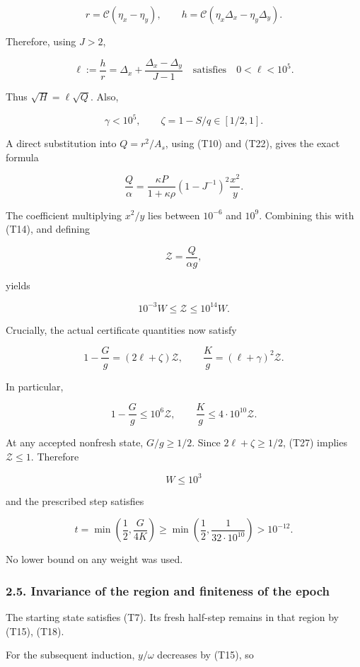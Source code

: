 \[
r=\mathcal C(\eta_x-\eta_y),
\qquad
h=\mathcal C(\eta_x\Delta_x-\eta_y\Delta_y).
\]

Therefore, using \(J>2\),

\[
\ell:=\frac hr
=\Delta_x+\frac{\Delta_x-\Delta_y}{J-1}
\quad\text{satisfies}\quad
0<\ell<10^5.
\tag{T23}
\]

Thus \(\sqrt H=\ell\sqrt Q\). Also,

\[
\gamma<10^5,\qquad
\zeta=1-S/q\in[1/2,1].
\tag{T24}
\]

A direct substitution into \(Q=r^2/A_s\), using (T10) and (T22), gives the exact formula

\[
\frac Q\alpha
=
\frac{\kappa P}{1+\kappa\rho}
(1-J^{-1})^2\frac{x^2}{y}.
\tag{T25}
\]

The coefficient multiplying \(x^2/y\) lies between \(10^{-6}\) and \(10^9\). Combining this with (T14), and defining

\[
\mathcal Z=\frac{Q}{\alpha g},
\]

yields

\[
10^{-3}W\le\mathcal Z\le10^{14}W.
\tag{T26}
\]

Crucially, the actual certificate quantities now satisfy

\[
1-\frac Gg=(2\ell+\zeta)\mathcal Z,
\qquad
\frac Kg=(\ell+\gamma)^2\mathcal Z.
\tag{T27}
\]

In particular,

\[
1-\frac Gg\le10^6\mathcal Z,
\qquad
\frac Kg\le4\cdot10^{10}\mathcal Z.
\tag{T28}
\]

At any accepted nonfresh state, \(G/g\ge1/2\). Since
\(2\ell+\zeta\ge1/2\), (T27) implies \(\mathcal Z\le1\). Therefore

\[
W\le10^3
\tag{T29}
\]

and the prescribed step satisfies

\[
t=\min\left(\frac12,\frac{G}{4K}\right)
\ge
\min\left(\frac12,\frac1{32\cdot10^{10}}\right)
>10^{-12}.
\tag{T30}
\]

No lower bound on any weight was used.

\subsubsection{2.5. Invariance of the region and finiteness of the epoch}

The starting state satisfies (T7). Its fresh half-step remains in that region by (T15), (T18).

For the subsequent induction, \(y/\omega\) decreases by (T15), so

